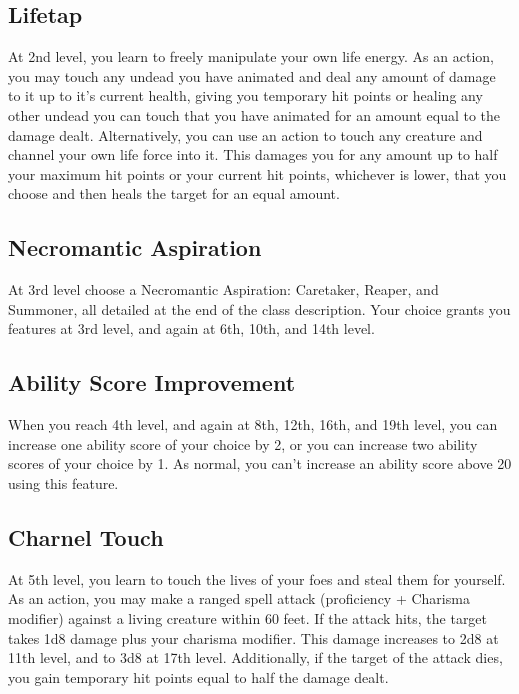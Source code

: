 \subsection{Lifetap}
At 2nd level, you learn to freely manipulate your own life energy. As an action, you may touch any undead you have animated and deal any amount of damage to it up to it’s current health, giving you temporary hit points or healing any other undead you can touch that you have animated for an amount equal to the damage dealt. Alternatively, you can use an action to touch any creature and channel your own life force into it. This damages you for any amount up to half your maximum hit points or your current hit points, whichever is lower, that you choose and then heals the target for an equal amount.

\subsection{Necromantic Aspiration}
At 3rd level choose a Necromantic Aspiration: Caretaker, Reaper, and Summoner, all detailed at the end of the class description. Your choice grants you features at 3rd level, and again at 6th, 10th, and 14th level.

\subsection{Ability Score Improvement}
When you reach 4th level, and again at 8th, 12th, 16th, and 19th level, you can increase one ability score of your choice by 2, or you can increase two ability scores of your choice by 1. As normal, you can’t increase an ability score above 20 using this feature.

\subsection{Charnel Touch}
At 5th level, you learn to touch the lives of your foes and steal them for yourself. As an action, you may make a ranged spell attack (proficiency + Charisma modifier) against a living creature within 60 feet. If the attack hits, the target takes 1d8 damage plus your charisma modifier. This damage increases to 2d8 at 11th level, and to 3d8 at 17th level.
Additionally, if the target of the attack dies, you gain temporary hit points equal to half the damage dealt.

